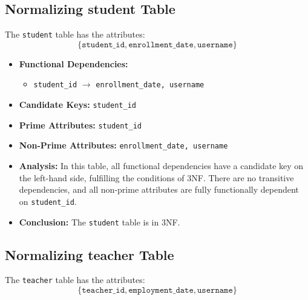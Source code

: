 \subsection{Normalizing student Table}

The \texttt{student} table has the attributes:
\[
\{ \texttt{student\_id}, \texttt{enrollment\_date}, \texttt{username} \}
\]

\begin{itemize}
    \item \textbf{Functional Dependencies:}
    \begin{itemize}
        \item \texttt{student\_id} $\rightarrow$ \texttt{enrollment\_date, username}
    \end{itemize}

    \item \textbf{Candidate Keys:} \texttt{student\_id}

    \item \textbf{Prime Attributes:} \texttt{student\_id}

    \item \textbf{Non-Prime Attributes:} \texttt{enrollment\_date, username}

    \item \textbf{Analysis:} In this table, all functional dependencies have a candidate key on the left-hand side, fulfilling the conditions of 3NF. There are no transitive dependencies, and all non-prime attributes are fully functionally dependent on \texttt{student\_id}.

    \item \textbf{Conclusion:} The \texttt{student} table is in 3NF.
\end{itemize}

\subsection{Normalizing teacher Table}

The \texttt{teacher} table has the attributes:
\[
\{ \texttt{teacher\_id}, \texttt{employment\_date}, \texttt{username} \}
\]

